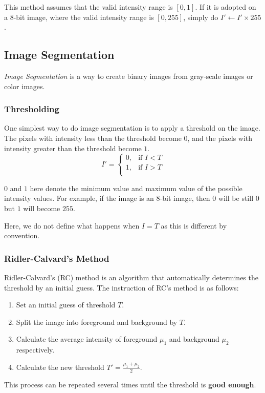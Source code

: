 \documentclass{note}
\begin{document}
\begin{note}
    This method assumes that the valid intensity range is $[0, 1]$. If it is adopted on a 8-bit image, where the valid intensity range is $[0, 255]$, simply do $I' \leftarrow I' \times 255$.
\end{note}

\subsection{Image Segmentation}

\textit{Image Segmentation} is a way to create binary images from gray-scale images or color images.

\subsubsection{Thresholding}

One simplest way to do image segmentation is to apply a threshold on the image. The pixels with intensity less than the threshold become $0$, and the pixels with intensity greater than the threshold become $1$.
\begin{equation*}
    I' = \begin{cases}
        0, & \text{if } I < T \\
        1, & \text{if } I > T \\
    \end{cases}
\end{equation*}

\begin{note}
    $0$ and $1$ here denote the minimum value and maximum value of the possible intensity values. For example, if the image is an 8-bit image, then $0$ will be still $0$ but $1$ will become $255$.
    
    Here, we do not define what happens when $I = T$ as this is different by convention. 
\end{note}

\subsubsection{Ridler-Calvard's Method}

Ridler-Calvard's (RC) method is an algorithm that automatically determines the threshold by an initial guess. The instruction of RC's method is as follows:
\begin{enumerate}
    \item Set an initial guess of threshold $T$.
    \item Split the image into foreground and background by $T$.
    \item Calculate the average intensity of foreground $\mu_1$ and background $\mu_2$ respectively.
    \item Calculate the new threshold $T' = \frac{\mu_1 + \mu_2}{2}$.
\end{enumerate}
This process can be repeated several times until the threshold is \textbf{good enough}. 
\end{document}
